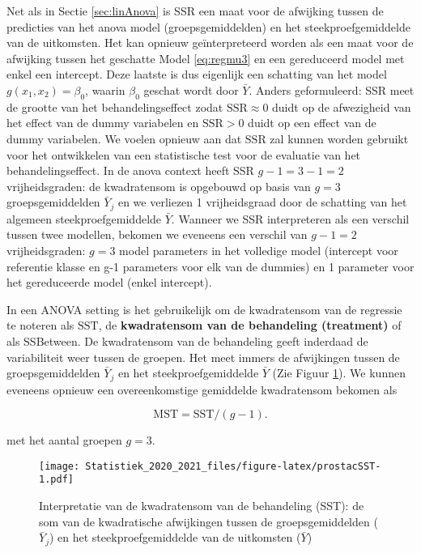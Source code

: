 \documentclass[
  12pt,dutch,coursenotes]{book}
\theoremstyle{definition}
\theoremstyle{definition}
\theoremstyle{definition}
\theoremstyle{remark}
\begin{document}
Net als in Sectie \ref{sec:linAnova} is SSR een maat voor de afwijking tussen de predicties van het anova model (groepsgemiddelden) en het steekproefgemiddelde van de uitkomsten.
Het kan opnieuw geïnterpreteerd worden als een maat voor de afwijking tussen het geschatte Model \eqref{eq:regmu3} en een gereduceerd model met enkel een intercept.
Deze laatste is dus eigenlijk een schatting van het model \(g(x_1,x_2)=\beta_0\), waarin \(\beta_0\) geschat wordt door \(\bar{Y}\).
Anders geformuleerd: SSR meet de grootte van het behandelingseffect zodat \(\text{SSR} \approx 0\) duidt op de afwezigheid van het effect van de dummy variabelen en \(\text{SSR}>0\) duidt op een effect van de dummy variabelen. We voelen opnieuw aan dat \(\text{SSR}\) zal kunnen worden gebruikt voor het ontwikkelen van een statistische test voor de evaluatie van het behandelingseffect.
In de anova context heeft SSR \(g-1=3-1=2\) vrijheidsgraden: de kwadratensom is opgebouwd op basis van \(g=3\) groepsgemiddelden \(\bar Y_j\) en we verliezen 1 vrijheidsgraad door de schatting van het algemeen steekproefgemiddelde \(\bar Y\).
Wanneer we SSR interpreteren als een verschil tussen twee modellen, bekomen we eveneens een verschil van \(g-1=2\) vrijheidsgraden: \(g=3\) model parameters in het volledige model (intercept voor referentie klasse en g-1 parameters voor elk van de dummies) en 1 parameter voor het gereduceerde model (enkel intercept).

In een ANOVA setting is het gebruikelijk om de kwadratensom van de regressie te noteren als \(\text{SST}\), de \textbf{kwadratensom van de behandeling (treatment)} of als SSBetween.
De kwadratensom van de behandeling geeft inderdaad de variabiliteit weer tussen de groepen.
Het meet immers de afwijkingen tussen de groepsgemiddelden \(\bar Y_j\) en het steekproefgemiddelde \(\bar Y\) (Zie Figuur \ref{fig:prostacSST}).
We kunnen eveneens opnieuw een overeenkomstige gemiddelde kwadratensom bekomen als

\[\text{MST}=\text{SST}/(g-1).\]

met het aantal groepen \(g=3\).

\begin{figure}
\centering
\texttt{[image: Statistiek\_2020\_2021\_files/figure-latex/prostacSST-1.pdf]}
\caption{\label{fig:prostacSST}Interpretatie van de kwadratensom van de behandeling (SST): de som van de kwadratische afwijkingen tussen de groepsgemiddelden (\(\bar Y_j\)) en het steekproefgemiddelde van de uitkomsten (\(\bar Y\))}
\end{figure}
\end{document}
